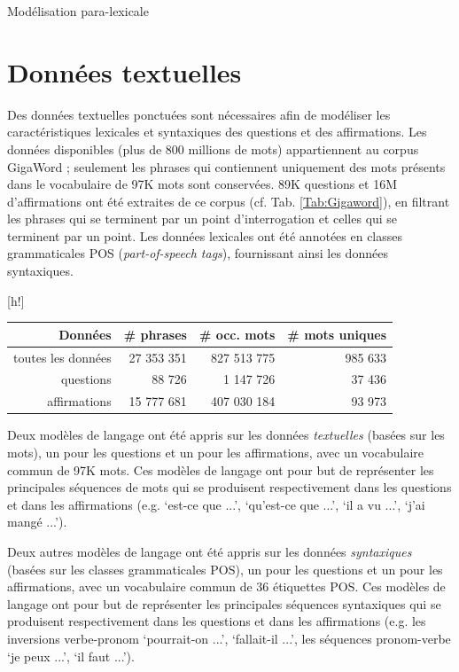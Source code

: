 \documentclass{style/these}
\makeatletter
\renewcommand\familydefault{ptm}
\renewenvironment{table}%
{ \renewcommand{\familydefault}{ptm}\selectfont
  \@float{table}}
  {\end@float}
\let\oldcite=\cite
\renewcommand{\cite}[1]{{\fontfamily{qcs}\selectfont{\color{darkerblue}[\oldcite{#1}]}}}
\makeatother
\begin{document}
\begin{part}{Modélisation para-lexicale}
\section{Données textuelles}
\renewcommand{\rightmark}{Données textuelles}

Des données textuelles ponctuées sont nécessaires afin de modéliser les caractéristiques lexicales et syntaxiques des questions et des affirmations. 
Les données disponibles (plus de 800 millions de mots) appartiennent au corpus GigaWord \cite{Mendonca:2011}; seulement les phrases qui contiennent uniquement des mots présents dans le vocabulaire de 97K mots sont conservées. 
89K questions et 16M d'affirmations ont été extraites de ce corpus (cf. Tab. \ref{Tab:Gigaword}), en filtrant les phrases qui se terminent par un point d'interrogation et celles qui se terminent par un point. 
Les données lexicales ont été annotées en classes grammaticales \acrshort{POS} (\textit{part-of-speech tags}), fournissant ainsi les données syntaxiques. 

\begin{table}[h!]
\centering
\begin{tabular}{|r|r|r|r|}
\hline
Données  		& \# phrases  	& \# occ. mots 	& \# mots uniques 	\\ \hline\hline
toutes les données	&  27 353 351	&  827 513 775 	&  985 633 		\\ \hline\hline
questions  		&      88 726	&    1 147 726  &   37 436 		\\ \hline
affirmations  		&  15 777 681	&  407 030 184  &   93 973 		\\ \hline
\end{tabular}
\caption{Donées textuelles du corpus Gigaword avec les sous-ensembles extraits de questions et d'affirmations}
\label{Tab:Gigaword}
\end{table}


Deux modèles de langage ont été appris sur les données \emph{textuelles} (basées sur les mots), un pour les questions et un pour les affirmations, avec un vocabulaire commun de 97K mots. 
Ces modèles de langage ont pour but de représenter les principales séquences de mots qui se produisent respectivement dans les questions et dans les affirmations (e.g. `est-ce que ...', `qu'est-ce que ...', `il a vu ...', `j'ai mangé ...').

Deux autres modèles de langage ont été appris sur les données \emph{syntaxiques} (basées sur les classes grammaticales \acrshort{POS}), un pour les questions et un pour les affirmations, avec un vocabulaire commun de 36 étiquettes \acrshort{POS}. 
Ces modèles de langage ont pour but de représenter les principales séquences syntaxiques qui se produisent respectivement dans les questions et dans les affirmations (e.g. les inversions verbe-pronom `pourrait-on ...', `fallait-il ...', les séquences pronom-verbe `je peux ...', `il faut ...').



\end{part}
\end{document}
